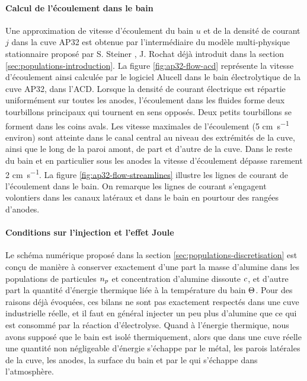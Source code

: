 \paragraph{Calcul de l'écoulement dans le bain} Une approximation de vitesse
d'écoulement du bain $u$ et de la densité de courant $j$ dans la cuve
AP32 est obtenue par l'intermédiaire du modèle multi-physique
stationnaire proposé par S. Steiner \cite{Steiner2009}, J. Rochat
\cite{Rochat2016} déjà introduit dans la section
\ref{sec:populations-introduction}. La figure \ref{fig:ap32-flow-acd}
représente la vitesse d'écoulement ainsi calculée par le logiciel
Alucell dans le bain électrolytique de la cuve AP32, dans
l'ACD. Lorsque la densité de courant électrique est répartie
uniformément sur toutes les anodes, l'écoulement dans les fluides
forme deux tourbillons principaux qui tournent en sens opposés. Deux
petits tourbillons se forment dans les coins avals. Les vitesse
maximales de l'écoulement (\num{5} \si{\centi\meter\per\second}
environ) sont atteinte dans le canal central au niveau des extrémités
de la cuve, ainsi que le long de la paroi amont, de part et d'autre de
la cuve. Dans le reste du bain et en particulier sous les anodes la
vitesse d'écoulement dépasse rarement \num{2}
\si{\centi\meter\per\second}. La figure
\ref{fig:ap32-flow-streamlines} illustre les lignes de courant de
l'écoulement dans le bain. On remarque les lignes de courant
s'engagent volontiers dans les canaux latéraux et dans le bain en
pourtour des rangées d'anodes.

\paragraph{Conditions sur l'injection et l'effet Joule}
Le schéma numérique proposé dans la section
\ref{sec:populations-discretisation} est conçu de manière à conserver
exactement d'une part la masse d'alumine dans les populations de
particules $n_p$ et concentration d'alumine dissoute
$c$, et d'autre part la quantité d'énergie thermique liée
à la température du bain $\Theta$. Pour des raisons déjà
évoquées, ces bilans ne sont pas exactement respectés dans une cuve
industrielle réelle, et il faut en général injecter un peu plus d'alumine
que ce qui est consommé par la réaction d'électrolyse. Quand à
l'énergie thermique, nous avons supposé que le bain est isolé
thermiquement, alors que dans une cuve réelle une quantité non
négligeable d'énergie s'échappe par le métal, les parois latérales de
la cuve, les anodes, la surface du bain et par le  qui
s'échappe dans l'atmosphère.


